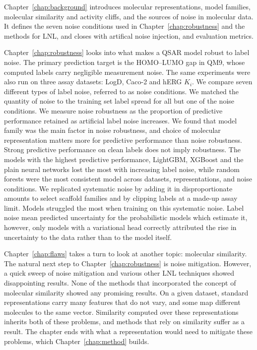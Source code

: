 Chapter~\ref{chap:background} introduces molecular representations, model families, molecular similarity and activity cliffs, and the sources of noise in molecular data. It defines the seven noise conditions used in Chapter~\ref{chap:robustness} and the methods for LNL, and closes with artifical noise injection, and evaluation metrics.

Chapter~\ref{chap:robustness} looks into what makes a QSAR model robust to label noise. The primary prediction target is the HOMO--LUMO gap in QM9, whose computed labels carry negligible measurement noise. The same experiments were also run on three assay datasets: LogD, Caco-2 and hERG $K_i$. We compare seven different types of label noise, referred to as noise conditions. We matched the quantity of noise to the training set label spread for all but one of the noise conditions. We measure noise robustness as the proportion of predictive performance retained as artificial label noise increases. We found that model family was the main factor in noise robustness, and choice of molecular representation matters more for predictive performance than noise robustness. Strong predictive performance on clean labels does not imply robustness. The models with the highest predictive performance, LightGBM, XGBoost and the plain neural networks lost the most with increasing label noise, while random forests were the most consistent model across datasets, representations, and noise conditions. We replicated systematic noise by adding it in disproportionate amounts to select scaffold families and by clipping labels at a made-up assay limit. Models struggled the most when training on this systematic noise. Label noise mean predicted uncertainty for the probabilistic models which estimate it, however, only models with a variational head correctly attributed the rise in uncertainty to the data rather than to the model itself. 

Chapter~\ref{chap:flaws} takes a turn to look at another topic: molecular similarity. The natural next step to Chapter~\ref{chap:robustness} is noise mitigation. However, a quick sweep of noise mitigation and various other LNL techniques showed disappointing results. None of the methods that incorporated the concept of molecular similarity showed any promising results. On a given dataset, standard representations carry many features that do not vary, and some map different molecules to the same vector. Similarity computed over these representations inherits both of these problems, and methods that rely on similarity suffer as a result. The chapter ends with what a representation would need to mitigate these problems, which Chapter~\ref{chap:method} builds.

